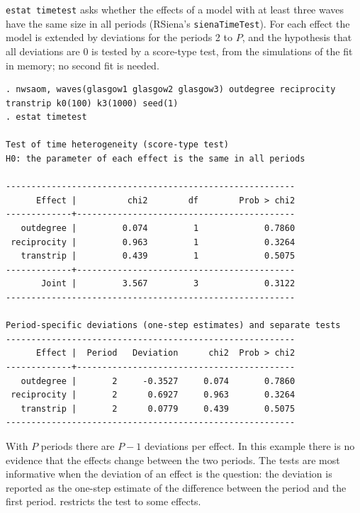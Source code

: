 \texttt{estat timetest} asks whether the effects of a model with at least three waves have the same size in all periods (RSiena's \texttt{sienaTimeTest}). For each effect the model is extended by deviations for the periods 2 to $P$, and the hypothesis that all deviations are 0 is tested by a score-type test, from the simulations of the fit in memory; no second fit is needed.
\begin{lstlisting}
. nwsaom, waves(glasgow1 glasgow2 glasgow3) outdegree reciprocity transtrip k0(100) k3(1000) seed(1)
. estat timetest

Test of time heterogeneity (score-type test)
H0: the parameter of each effect is the same in all periods

---------------------------------------------------------
      Effect |          chi2        df        Prob > chi2
-------------+-------------------------------------------
   outdegree |         0.074         1             0.7860
 reciprocity |         0.963         1             0.3264
   transtrip |         0.439         1             0.5075
-------------+-------------------------------------------
       Joint |         3.567         3             0.3122
---------------------------------------------------------

Period-specific deviations (one-step estimates) and separate tests
---------------------------------------------------------
      Effect |  Period   Deviation      chi2  Prob > chi2
-------------+-------------------------------------------
   outdegree |       2     -0.3527     0.074       0.7860
 reciprocity |       2      0.6927     0.963       0.3264
   transtrip |       2      0.0779     0.439       0.5075
---------------------------------------------------------
\end{lstlisting}
With $P$ periods there are $P-1$ deviations per effect. In this example there is no evidence that the effects change between the two periods. The tests are most informative when the deviation of an effect is the question: the deviation is reported as the one-step estimate of the difference between the period and the first period.  restricts the test to some effects.


